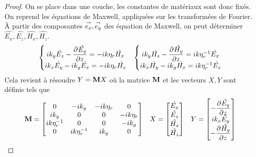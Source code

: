       \begin{proof}
        On se place dans une couche, les constantes de matériaux sont donc fixés.
        On reprend les équations de Maxwell, appliquées sur les transformées de Fourier. À partir des composantes \(\vect{e_x},\vect{e_y}\) des équation de Maxwell, on peut déterminer \(\hat{E_x},\hat{E_z},\hat{H_x},\hat{H_z}\).
        \begin{align*}
            \left\lbrace
            \begin{matrix}
                ik_y \hat{E_z}  - \ddr{z}{\hat{E_y}} = -i k \eta_r  \hat{H_x}
                \\
                ik_x \hat{E_y} - ik_y \hat{E_x} = -i k \eta_r  \hat{H_z}
            \end{matrix}
            \right. 
            &&
            \left\lbrace
            \begin{matrix}
                ik_y \hat{H_z}  - \ddr{z}{\hat{H_y}} = i k \eta_r^{-1} \hat{E_x}
                \\
                ik_x \hat{H_y} - ik_y \hat{H_x} = i k \eta_r^{-1} \hat{E_z}
            \end{matrix}
            \right.
        \end{align*}
        Cela revient à résoudre \(Y = \mat{M}X\) où la matrice \(\mat{M}\) et les vecteurs \(X, Y\) sont définis tels que
        \begin{align*}
          \mat{M} =
          \begin{bmatrix}
          0 & -ik_y & -ik \eta_r & 0
          \\
          ik_y & 0 & 0 & -ik \eta_r
          \\
          ik \eta_r^{-1} & 0 & 0 & -ik_y
          \\
          0 & ik \eta_r^{-1} & ik_y & 0
          \end{bmatrix}
          &&
          X =
          \begin{bmatrix}
            \hat{E_x}\\
            \hat{E_z}\\
            \hat{H_x}\\
            \hat{H_z}
          \end{bmatrix}
          &&
          Y =
          \begin{bmatrix}
            -\ddr{z}{\hat{E_y}}\\
            ik_x\hat{E_y}\\
            -\ddr{z}{\hat{H_y}}\\

\end{bmatrix}
\end{align*}
\end{proof}
